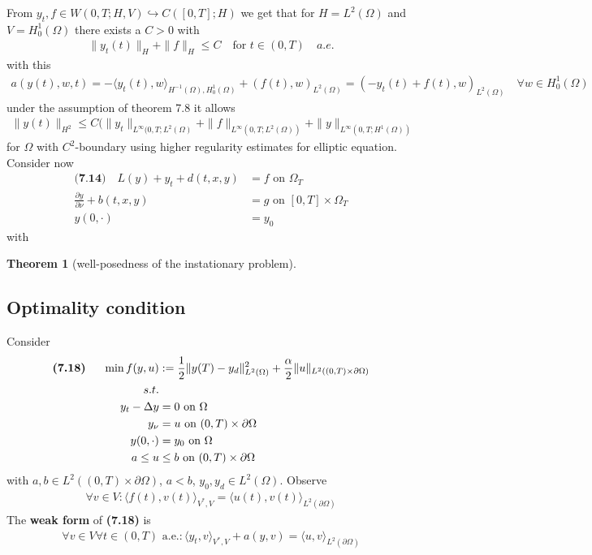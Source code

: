 \documentclass[a4paper,11pt,fleqn]{book}
\newtheorem{theorem}{Theorem}[section]
\theoremstyle{definition}
\theoremstyle{remark}
\begin{document}
From $y_t, f \in W(0, T; H, V) \hookrightarrow C([0, T]; H)$ we get that for $H = L^2(\Omega)$ and $V = H_0^1(\Omega)$ there exists a $C > 0$ with
\begin{align*}
	\|y_t(t)\|_H + \|f\|_H \le C \quad \text{for } t \in (0, T) \quad a.e.
\end{align*}
with this
\begin{align*}
	a(y(t), w, t) = - \langle y_t(t), w \rangle_{H^{-1}(\Omega), H^1_0(\Omega)} + (f(t), w)_{L^2(\Omega)} = (-y_t(t) + f(t), w )_{L^2(\Omega)} \quad\forall w \in H^1_0(\Omega)
\end{align*}
under the assumption of theorem 7.8 it allows
\begin{align*}
	\|y(t)\|_{H^2} \le C (\|y_t\|_{L^\infty(0, T; L^2(\Omega)} + \|f\|_{L^\infty(0, T; L^2(\Omega))} + \|y\|_{L^\infty(0, T; H^1(\Omega))}
\end{align*}
for $\Omega$ with $C^2$-boundary using higher regularity estimates for elliptic equation. \\
Consider now
\begin{align*}
\textbf{(7.14)} \quad 
	L(y) + y_t + d(t, x, y) &= f \text{ on } \Omega_T\\
	\frac{\partial y}{\partial \nu} + b(t, x, y) &= g \text{ on } [0, T] \times \Omega_T\\
	y(0, \cdot) &= y_0
\end{align*}
with


\begin{theorem}[well-posedness of the instationary problem]
	
\end{theorem}



\subsection{Optimality condition}
Consider 
\begin{align*}
	\textbf{(7.18) \quad}
	\min f(y,u) &:= \frac{1}{2} \|y(T) - y_d\|_{L^2(\Omega)}^2 + \frac{\alpha}{2}\|u\|_{L^2((0, T) \times \partial\Omega)}\\
	s.t.\\
	y_t - \Delta y &= 0 \text{ on } \Omega\\
	y_\nu &= u \text{ on } (0, T) \times \partial \Omega\\
	y(0, \cdot) &= y_0 \text{ on } \Omega\\
	a \le u &\le b \text{ on } (0, T) \times \partial \Omega
\end{align*}
with $a, b \in L^2((0, T) \times \partial \Omega)$, $a < b$, $y_0, y_d \in L^2(\Omega)$. 
Observe
\begin{align*}
\forall v \in V:
	\langle f(t), v(t) \rangle_{V^*, V} = \langle u(t), v(t) \rangle_{L^2(\partial\Omega)}
\end{align*}
The \textbf{weak form} of \textbf{(7.18)} is 
\begin{align*}
	\forall v \in V \forall t \in (0, T) \text{ a.e.}: 
	\langle y_t, v \rangle_{V^*, V} + a(y, v) = \langle u, v\rangle_{L^2(\partial\Omega)}
\end{align*}
\end{document}
